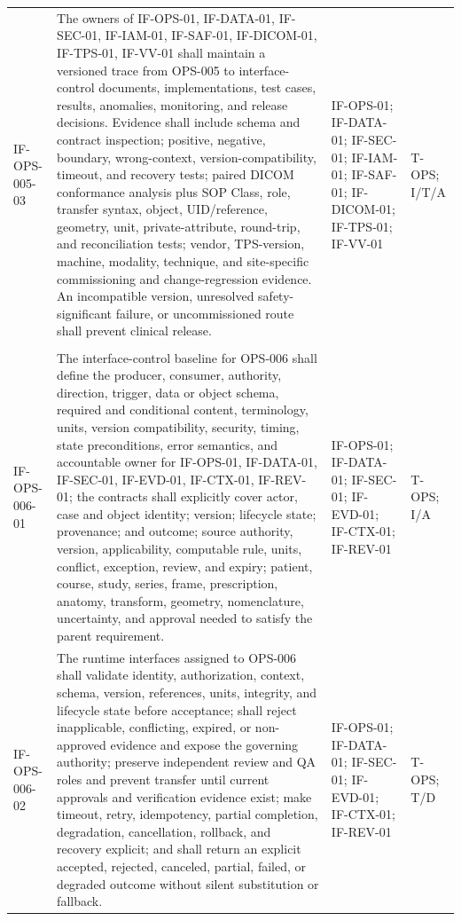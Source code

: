 \documentclass[11pt,letterpaper]{article}
\begin{document}
\begin{scriptsize}
\begin{longtable}{@{}L{0.14\textwidth}L{0.49\textwidth}L{0.19\textwidth}L{0.10\textwidth}@{}}
\addlinespace[2pt]
\mbox{IF-OPS-005-03} & The owners of IF-OPS-01, IF-DATA-01, IF-SEC-01, IF-IAM-01, IF-SAF-01, IF-DICOM-01, IF-TPS-01, IF-VV-01 shall maintain a versioned trace from OPS-005 to interface-control documents, implementations, test cases, results, anomalies, monitoring, and release decisions. Evidence shall include schema and contract inspection; positive, negative, boundary, wrong-context, version-compatibility, timeout, and recovery tests; paired DICOM conformance analysis plus SOP Class, role, transfer syntax, object, UID\slash\allowbreak{}reference, geometry, unit, private-attribute, round-trip, and reconciliation tests; vendor, TPS-version, machine, modality, technique, and site-specific commissioning and change-regression evidence. An incompatible version, unresolved safety-significant failure, or uncommissioned route shall prevent clinical release. & IF-OPS-01; IF-DATA-01; IF-SEC-01; IF-IAM-01; IF-SAF-01; IF-DICOM-01; IF-TPS-01; IF-VV-01 & T-OPS; I\slash\allowbreak{}T\slash\allowbreak{}A \\
\addlinespace[2pt]
 \\
\addlinespace[2pt]
\mbox{IF-OPS-006-01} & The interface-control baseline for OPS-006 shall define the producer, consumer, authority, direction, trigger, data or object schema, required and conditional content, terminology, units, version compatibility, security, timing, state preconditions, error semantics, and accountable owner for IF-OPS-01, IF-DATA-01, IF-SEC-01, IF-EVD-01, IF-CTX-01, IF-REV-01; the contracts shall explicitly cover actor, case and object identity; version; lifecycle state; provenance; and outcome; source authority, version, applicability, computable rule, units, conflict, exception, review, and expiry; patient, course, study, series, frame, prescription, anatomy, transform, geometry, nomenclature, uncertainty, and approval needed to satisfy the parent requirement. & IF-OPS-01; IF-DATA-01; IF-SEC-01; IF-EVD-01; IF-CTX-01; IF-REV-01 & T-OPS; I\slash\allowbreak{}A \\
\addlinespace[2pt]
\mbox{IF-OPS-006-02} & The runtime interfaces assigned to OPS-006 shall validate identity, authorization, context, schema, version, references, units, integrity, and lifecycle state before acceptance; shall reject inapplicable, conflicting, expired, or non-approved evidence and expose the governing authority; preserve independent review and QA roles and prevent transfer until current approvals and verification evidence exist; make timeout, retry, idempotency, partial completion, degradation, cancellation, rollback, and recovery explicit; and shall return an explicit accepted, rejected, canceled, partial, failed, or degraded outcome without silent substitution or fallback. & IF-OPS-01; IF-DATA-01; IF-SEC-01; IF-EVD-01; IF-CTX-01; IF-REV-01 & T-OPS; T\slash\allowbreak{}D \\

\end{longtable}
\end{scriptsize}
\end{document}
